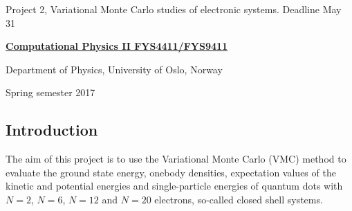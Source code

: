 \documentclass[%
oneside,                 %
final,                   %
10pt]{article}
\begin{document}

\newcommand{\exercisesection}[1]{\subsection*{#1}}






\thispagestyle{empty}

\begin{center}
{\LARGE\bf
\begin{spacing}{1.25}
Project 2, Variational Monte Carlo studies of electronic systems. Deadline May 31  
\end{spacing}
}
\end{center}


\begin{center}
{\bf \href{{http://www.uio.no/studier/emner/matnat/fys/FYS4411/index-eng.html}}{Computational Physics II FYS4411/FYS9411}}
\end{center}

    \begin{center}
\centerline{{\small Department of Physics, University of Oslo, Norway}}
\end{center}
    

\begin{center}
Spring semester 2017
\end{center}

\vspace{1cm}


\subsection*{Introduction}

The aim of this project is to use the Variational Monte
Carlo (VMC) method to evaluate 
the ground state energy, onebody densities, expectation values of the kinetic and potential energies 
 and single-particle energies of 
quantum dots with $N=2$, $N=6$, $N=12$ and $N=20$ electrons, so-called closed shell systems.
\end{document}
